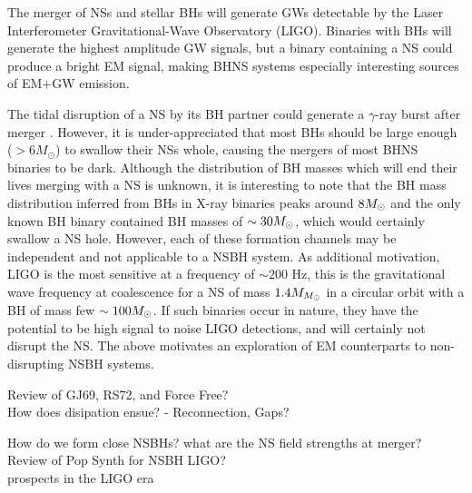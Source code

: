 {The merger of NSs and stellar BHs will generate GWs detectable by the Laser
Interferometer Gravitational-Wave Observatory (LIGO). Binaries with BHs will
generate the highest amplitude GW signals, but a binary containing a NS could
produce a bright EM signal, making BHNS systems especially interesting sources
of EM+GW emission.

The tidal disruption of a NS by its BH partner could generate a $\gamma$-ray
burst after merger \citep{NPP:NSBH_GRB:1992}. However, it is under-appreciated
that most BHs should be large enough ($> 6M_\odot $) to swallow their NSs
whole, causing the mergers of most BHNS binaries to be dark. 
Although the distribution of BH masses
which will end their lives merging with a NS is unknown, it is interesting to
note that the BH mass distribution inferred from BHs in X-ray binaries peaks
around $8 {M_{\odot}}$ \citep{Orzel:2008} and the only known BH binary contained BH
masses of $\sim 30 {M_{\odot}}$, which would certainly swallow a NS hole. However,
each of these formation channels may be independent and not applicable to a
NSBH system. As additional motivation, LIGO is the most sensitive at a
frequency of $\sim 200$ Hz, this is the gravitational wave frequency at
coalescence for a NS of mass $1.4 M_{{M_{\odot}}}$ in a circular orbit with a BH of
mass few $\sim100 {M_{\odot}}$. If such binaries occur in nature, they have the
potential to be high signal to noise LIGO detections, and will certainly not
disrupt the NS. The above motivates an exploration of EM counterparts to non-
disrupting NSBH systems.





Review of GJ69, RS72, and Force Free?\\
How does disipation ensue? - Reconnection, Gaps?

How do we form close NSBHs?
what are the NS field strengths at merger?\\

Review of Pop Synth for NSBH LIGO?\\
prospects in the LIGO era









}
